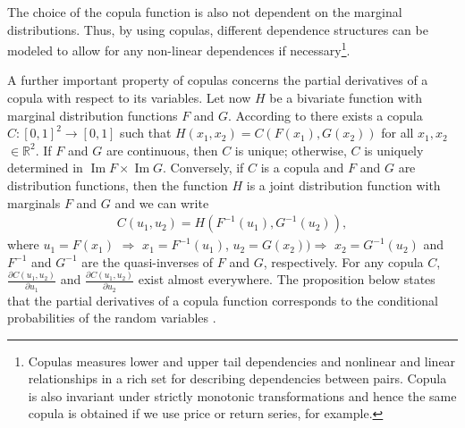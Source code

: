\documentclass[a4paper]{article}
\DeclareMathOperator{\Ima}{Im}
\begin{document}
	The choice of the copula function is also not dependent on the marginal distributions. Thus, by using copulas, different dependence structures can be modeled to allow for any non-linear dependences if necessary\footnote{Copulas measures lower and upper tail dependencies and nonlinear and linear relationships in a rich set for describing dependencies between pairs. Copula is also invariant under strictly monotonic transformations \citep{cherubini04,nelsen06} and hence the same copula is obtained if we use price or return series, for example.}.
	
	A further important property of copulas concerns the partial derivatives of a copula with respect to its variables. Let now $H$ be a bivariate function with marginal distribution functions $F$ and $G$. According to \citet*{sklar1959} there exists a copula $C:\left[ 0,1\right] ^{2}\rightarrow \left[ 0,1\right] $ such that $H(x_{1},x_{2})=C(F(x_{1}),G(x_{2}))$ for all $x_{1},x_{2}$ $\in\mathbb{R}^{2}$. If $F$ and $G$ are continuous, then $C$ is unique; otherwise, $C$ is uniquely determined in $\Ima F\times \Ima G$. Conversely, if $C$ is a copula and $F$ and $G$ are distribution functions, then the function $H$ is a joint distribution function with marginals $F$ and $G$ and we can write
	\begin{equation}
	\begin{aligned}
	C(u_{1},u_{2})=H(F^{-1}(u_{1}),G^{-1}(u_{2})),
	\end{aligned}
	\label{eq:eq07}
	\end{equation}
	where $u_{1}=F(x_{1})$ $\Rightarrow $ $x_{1}=F^{-1}(u_{1})$, $u_{2}=G(x_{2}))\Rightarrow $ $x_{2}=G^{-1}(u_{2})$ and $F^{-1}$ and $G^{-1}$ are the quasi-inverses of $F$ and $G$, respectively. For any copula $C$, $\frac{\partial C\left( u_{1},u_{2}\right) }{\partial u_{1}}$ and $\frac{\partial C\left( u_{1},u_{2}\right) }{\partial u_{2}}$ exist almost everywhere. The proposition below states that the partial derivatives of a copula function corresponds to the conditional probabilities of the random variables \citep[see][]{cherubini04,nelsen06}.
	
	\vspace{0.6cm}
	
\end{document}
